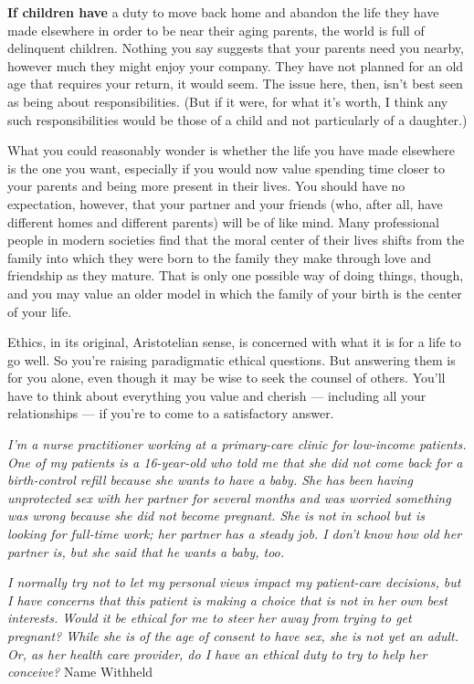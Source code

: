 \textbf{If children have} a duty to move back home and abandon the life
they have made elsewhere in order to be near their aging parents, the
world is full of delinquent children. Nothing you say suggests that your
parents need you nearby, however much they might enjoy your company.
They have not planned for an old age that requires your return, it would
seem. The issue here, then, isn't best seen as being about
responsibilities. (But if it were, for what it's worth, I think any such
responsibilities would be those of a child and not particularly of a
daughter.)

What you could reasonably wonder is whether the life you have made
elsewhere is the one you want, especially if you would now value
spending time closer to your parents and being more present in their
lives. You should have no expectation, however, that your partner and
your friends (who, after all, have different homes and different
parents) will be of like mind. Many professional people in modern
societies find that the moral center of their lives shifts from the
family into which they were born to the family they make through love
and friendship as they mature. That is only one possible way of doing
things, though, and you may value an older model in which the family of
your birth is the center of your life.

Ethics, in its original, Aristotelian sense, is concerned with what it
is for a life to go well. So you're raising paradigmatic ethical
questions. But answering them is for you alone, even though it may be
wise to seek the counsel of others. You'll have to think about
everything you value and cherish --- including all your relationships
--- if you're to come to a satisfactory answer.

\emph{I'm a nurse practitioner working at a primary-care clinic for
low-income patients. One of my patients is a 16-year-old who told me
that she did not come back for a birth-control refill because she wants
to have a baby. She has been having unprotected sex with her partner for
several months and was worried something was wrong because she did not
become pregnant. She is not in school but is looking for full-time work;
her partner has a steady job. I don't know how old her partner is, but
she said that he wants a baby, too.}

\emph{I normally try not to let my personal views impact my patient-care
decisions, but I have concerns that this patient is making a choice that
is not in her own best interests. Would it be ethical for me to steer
her away from trying to get pregnant? While she is of the age of consent
to have sex, she is not yet an adult. Or, as her health care provider,
do I have an ethical duty to try to help her conceive?} Name Withheld

